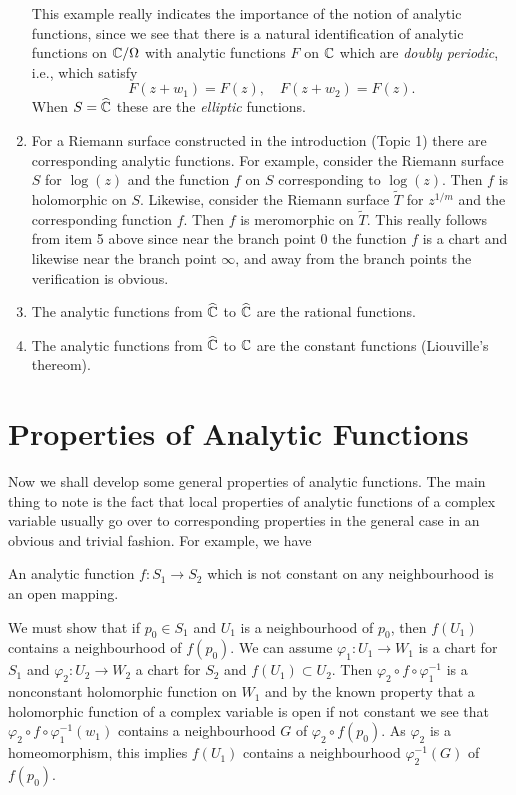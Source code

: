 \documentclass[a4paper,11pt]{article}
\begin{document}
\begin{exmp}
\begin{enumerate}
    This example really indicates the importance of the notion of
    analytic functions, since we see that there is a natural
    identification of analytic functions on ${\mathbb C} / \Omega$ with
    analytic functions $F$ on ${\mathbb C}$ which are \emph{doubly periodic},
    i.e., which satisfy
    $$
    F(z+w_1) = F(z),\quad F(z+w_2) = F(z).
    $$
    When $S = \widehat{{\mathbb C}}$ these are the \emph{elliptic} functions.

  \item For a Riemann surface constructed in the introduction (Topic
    1) there are corresponding analytic functions.   For example,
    consider the Riemann surface $S$ for $\log(z)$ and the  function
    $f$ on $S$ corresponding to $\log(z)$.  Then $f$ is holomorphic on
    $S$.  Likewise, consider the Riemann surface $\widetilde{T}$ for
    $z^{1/m}$ and the corresponding function $f$.  Then $f$ is
    meromorphic on $\widetilde{T}$.  This really follows from item 5
    above since near the branch point 0 the function $f$ is a chart
    and likewise near the branch point $\infty$, and away from the
    branch points the verification is obvious.
  \item The analytic functions from $\widehat{{\mathbb C}}$ to
    $\widehat{{\mathbb C}}$ are the rational functions.
  \item The analytic functions from $\widehat{{\mathbb C}}$ to ${\mathbb C}$ are the
    constant functions (Liouville's thereom).
  \end{enumerate}
\end{exmp}


\section{Properties of Analytic Functions}

Now we shall develop some general properties of analytic functions.
The main thing to note is the fact that local properties of analytic
functions of a complex variable usually go over to corresponding
properties in the general case in an obvious and trivial fashion.  For
example, we have

\begin{propn}
  \label{propn:4}
  An analytic function $f : S_1 \to S_2$ which is not constant on
  any neighbourhood is an open mapping.
\end{propn}
\begin{myproof}
  We must show that if $p_0 \in S_1$ and $U_1$ is a neighbourhood of
  $p_0$, then $f(U_1)$ contains a neighbourhood of $f(p_0)$.  We can
  assume $\varphi_1 : U_1 \to W_1$ is a chart for $S_1$ and $\varphi_2
  : U_2 \to W_2$  a chart for $S_2$ and $f(U_1) \subset U_2$.  Then
  $\varphi_2 \circ f \circ \varphi_1^{-1}$ is a nonconstant
  holomorphic function on $W_1$ and by the known property that a
  holomorphic function of a complex variable is open if not constant
  we see that $\varphi_2 \circ f \circ \varphi_1^{-1}(w_1)$ contains a
  neighbourhood $G$ of $\varphi_2 \circ f(p_0)$.  As $\varphi_2$ is a
  homeomorphism, this implies $f(U_1)$ contains a neighbourhood
  $\varphi_2^{-1}(G)$ of $f(p_0)$.
\end{myproof}
\end{document}
